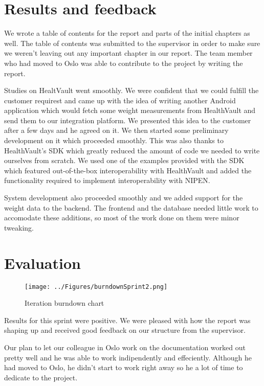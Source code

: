 \section{Results and feedback}

We wrote a table of contents for the report and parts of the initial chapters as well.
The table of contents was submitted to the supervisor in order to make sure we weren't leaving out any important chapter in our report. 
The team member who had moved to Oslo was able to contribute to the project by writing the report.

Studies on HealtVault went smoothly. We were confident that we could fulfill the customer requirest and came up with the idea of writing another Android application which would fetch some weight measurements from HealthVault and send them to our integration platform.
We presented this idea to the customer after a few days and he agreed on it.
We then started some preliminary development on it which proceeded smoothly.
This was also thanks to HealthVault's SDK which greatly reduced the amount of code we needed to write ourselves from scratch. 
We used one of the examples provided with the SDK which featured out-of-the-box interoperability with HealthVault and added the functionality required to implement interoperability with NIPEN.

System development also proceeded smoothly and we added support for the weight data to the backend.
The frontend and the database needed little work to accomodate these additions, so most of the work done on them were minor tweaking.

\section{Evaluation}

\begin{figure}
\centering
\texttt{[image: ../Figures/burndownSprint2.png]}
\caption{Iteration burndown chart}
\label{figure:burndownsprint2}
\end{figure}

Results for this sprint were positive. We were pleased with how the report was shaping up and received good feedback on our structure from the supervisor.

Our plan to let our colleague in Oslo work on the documentation worked out pretty well and he was able to work indipendently and effeciently. 
Although he had moved to Oslo, he didn't start to work right away so he a lot of time to dedicate to the project.


